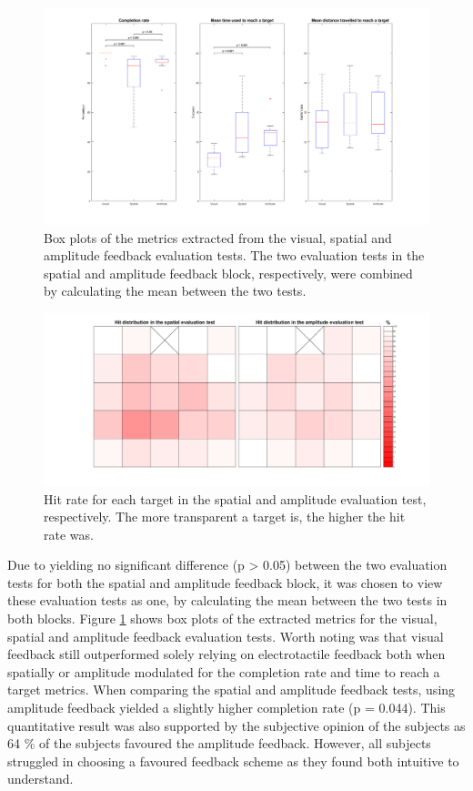 \begin{figure}[t]                 
	\includegraphics[width=.8\textwidth]{figures/boxplot_results}
	\caption{Box plots of the metrics extracted from the visual, spatial and amplitude feedback evaluation tests. The two evaluation tests in the spatial and amplitude feedback block, respectively, were combined by calculating the mean between the two tests.}
	\label{fig:pa:boxplot_results} 
\end{figure}

\begin{figure}[t]                 
	\includegraphics[width=.8\textwidth]{figures/hit_dist}
	\caption{Hit rate for each target in the spatial and amplitude evaluation test, respectively. The more transparent a target is, the higher the hit rate was.}
	\label{fig:pa:hit_dist} 
\end{figure}
Due to yielding no significant difference (p > 0.05) between the two evaluation tests for both the spatial and amplitude feedback block, it was chosen to view these evaluation tests as one, by calculating the mean between the two tests in both blocks. Figure \ref{fig:pa:boxplot_results} shows box plots of the extracted metrics for the visual, spatial and amplitude feedback evaluation tests. Worth noting was that visual feedback still outperformed solely relying on electrotactile feedback both when spatially or amplitude modulated for the completion rate and time to reach a target metrics. When comparing the spatial and amplitude feedback tests, using amplitude feedback yielded a slightly higher completion rate (p = 0.044). This quantitative result was also supported by the subjective opinion of the subjects as 64 \% of the subjects favoured the amplitude feedback. However, all subjects struggled in choosing a favoured feedback scheme as they found both intuitive to understand. 

